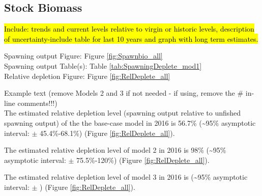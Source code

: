 \documentclass[12pt,]{article}
\begin{document}
\FloatBarrier

\subsection*{Stock Biomass}\label{stock-biomass}

\hl{Include: trends and current levels relative to virgin or historic levels, 
description of uncertainty-include table for last 10 years and graph with 
long term estimates.}

Spawning output Figure: Figure \ref{fig:Spawnbio_all}\\
Spawning output Table(s): Table \ref{tab:SpawningDeplete_mod1}\\
Relative depletion Figure: Figure \ref{fig:RelDeplete_all}

Example text (remove Models 2 and 3 if not needed - if using, remove the
\# in-line comments!!!)\\
The estimated relative depletion level (spawning output relative to
unfished spawning output) of the the base-case model in 2016 is 56.7\%
(\textasciitilde{}95\% asymptotic interval: \(\pm\) 45.4\%-68.1\%)
(Figure \ref{fig:RelDeplete_all}).

The estimated relative depletion level of model 2 in 2016 is 98\%
(\textasciitilde{}95\% asymptotic interval: \(\pm\) 75.5\%-120\%)
(Figure \ref{fig:RelDeplete_all}).

The estimated relative depletion level of model 3 in 2016 is
(\textasciitilde{}95\% asymptotic interval: \(\pm\) ) (Figure
\ref{fig:RelDeplete_all}).

\FloatBarrier
\end{document}
